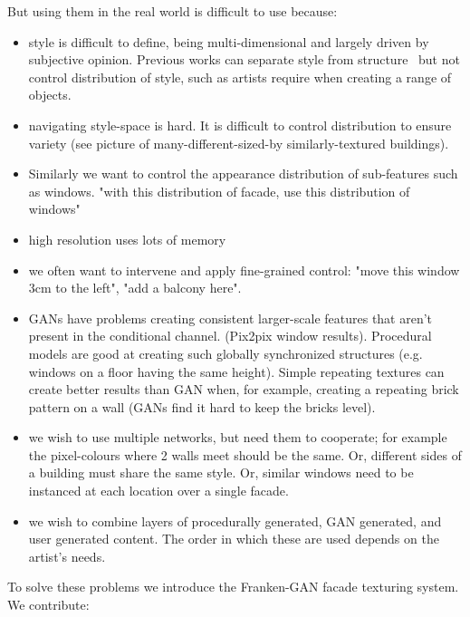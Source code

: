 But using them in the real world is difficult to use because:
\begin{itemize}
    \item style is difficult to define, being multi-dimensional and largely driven by subjective opinion. Previous works can separate style from structure~\cite{papers} but not control distribution of style, such as artists require when creating a range of objects. 
    \item navigating style-space is hard. It is difficult to control distribution to ensure variety (see picture of many-different-sized-by similarly-textured buildings). 
    \item Similarly we want to control the appearance distribution of sub-features such as windows. "with this distribution of facade, use this distribution of windows"
    \item high resolution uses lots of memory~\cite{pix2pixHD}
    \item we often want to intervene and apply fine-grained control: "move this window 3cm to the left", "add a balcony here".
    \item GANs have problems creating consistent larger-scale features that aren't present in the conditional channel. (Pix2pix window results). Procedural models are good at creating such globally synchronized structures (e.g. windows on a floor having the same height). Simple repeating textures can create better results than GAN when, for example, creating a repeating brick pattern on a wall (GANs find it hard to keep the bricks level).
    \item we wish to use multiple networks, but need them to cooperate; for example the pixel-colours where 2 walls meet should be the same. Or, different sides of a building must share the same style. Or, similar windows need to be instanced at each location over a single facade.
    \item we wish to combine layers of procedurally generated, GAN generated, and user generated content. The order in which these are used depends on the artist's needs.
\end{itemize}

To solve these problems we introduce the Franken-GAN facade texturing system. We contribute:

